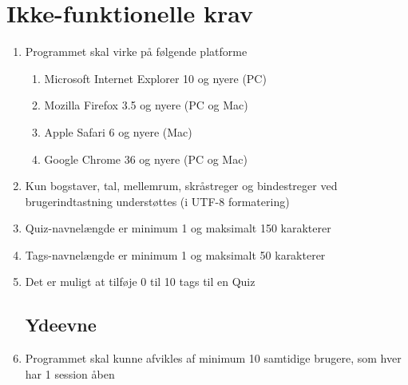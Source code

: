 \section{Ikke-funktionelle krav}
\begin{enumerate}
	\subsection*{Brugbarhed}
	\item Programmet skal virke på følgende platforme
	\begin{enumerate}
		\item Microsoft Internet Explorer 10 og nyere (PC)
		\item Mozilla Firefox 3.5 og nyere (PC og Mac)
		\item Apple Safari 6 og nyere (Mac)
		\item Google Chrome 36 og nyere (PC og Mac)
	\end{enumerate}
	
	\item Kun bogstaver, tal, mellemrum, skråstreger og bindestreger ved brugerindtastning understøttes (i UTF-8 formatering)
	\item Quiz-navnelængde er minimum 1 og maksimalt 150 karakterer
	\item Tags-navnelængde er minimum 1 og maksimalt 50 karakterer 
	\item Det er muligt at tilføje 0 til 10 tags til en Quiz
	\subsection*{Ydeevne}
	\item Programmet skal kunne afvikles af minimum 10 samtidige brugere, som hver har 1 session åben
\end{enumerate}